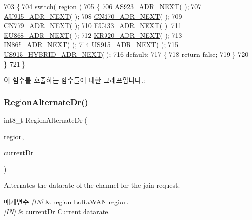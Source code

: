 \begin{DoxyCode}
703 \{
704     \textcolor{keywordflow}{switch}( region )
705     \{
706         \mbox{\hyperlink{_region_8c_a19e9c439af66a22efb0139d66dc60725}{AS923\_ADR\_NEXT}}( );
707         \mbox{\hyperlink{_region_8c_a46d035418f204f008be18b204dcf8a9b}{AU915\_ADR\_NEXT}}( );
708         \mbox{\hyperlink{_region_8c_a53b706cbdcca5434468885a6fc6b46cd}{CN470\_ADR\_NEXT}}( );
709         \mbox{\hyperlink{_region_8c_a87b11ac3d96d8d3ffee7ec505dedbfd0}{CN779\_ADR\_NEXT}}( );
710         \mbox{\hyperlink{_region_8c_ae98d5bca996cbce199c9300614242a8c}{EU433\_ADR\_NEXT}}( );
711         \mbox{\hyperlink{_region_8c_a02c768ba60ee7bfba2a88394f48a999e}{EU868\_ADR\_NEXT}}( );
712         \mbox{\hyperlink{_region_8c_a6fcb2fc848647dfe89888f048ee63482}{KR920\_ADR\_NEXT}}( );
713         \mbox{\hyperlink{_region_8c_a42e508348a83b21a02fb657da5ca963c}{IN865\_ADR\_NEXT}}( );
714         \mbox{\hyperlink{_region_8c_ac87a99bd7d9f404fabb3800b6c26d8be}{US915\_ADR\_NEXT}}( );
715         \mbox{\hyperlink{_region_8c_a3fce860399b6ab0f34a875590760a6bb}{US915\_HYBRID\_ADR\_NEXT}}( );
716         \textcolor{keywordflow}{default}:
717         \{
718             \textcolor{keywordflow}{return} \textcolor{keyword}{false};
719         \}
720     \}
721 \}
\end{DoxyCode}
이 함수를 호출하는 함수들에 대한 그래프입니다.\+:
\mbox{\label{group___r_e_g_i_o_n_ga28f24373a279e7665ceb6cd4be30f558}} 
\subsubsection{\texorpdfstring{Region\+Alternate\+Dr()}{RegionAlternateDr()}}
{\footnotesize\ttfamily int8\+\_\+t Region\+Alternate\+Dr (\begin{DoxyParamCaption}\item[{\mbox{\hyperlink{group___l_o_r_a_m_a_c_ga80c48efda9ae02e14b58160d34a798dd}{Lo\+Ra\+Mac\+Region\+\_\+t}}}]{region,  }\item[{int8\+\_\+t}]{current\+Dr }\end{DoxyParamCaption})}



Alternates the datarate of the channel for the join request. 


\begin{DoxyParams}{매개변수}
{\em \mbox{[}\+I\+N\mbox{]}} & region Lo\+Ra\+W\+AN region.\\
\hline
{\em \mbox{[}\+I\+N\mbox{]}} & current\+Dr Current datarate.\\
\hline
\end{DoxyParams}

